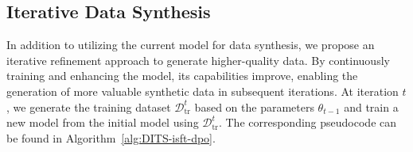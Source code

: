 \subsection{Iterative Data Synthesis}
\label{subsection:iterative data synthesis}
In addition to utilizing the current model for data synthesis, we propose an iterative refinement approach to generate higher-quality data. By continuously training and enhancing the model, its capabilities improve, enabling the generation of more valuable synthetic data in subsequent iterations. At iteration $t$, we generate the training dataset $\mathcal{D}_{\text{tr}}^t$ based on the parameters $\theta_{t-1}$ and train a new model from the initial model using $\mathcal{D}_{\text{tr}}^t$. The corresponding pseudocode can be found in Algorithm~\ref{alg:DITS-isft-dpo}.











